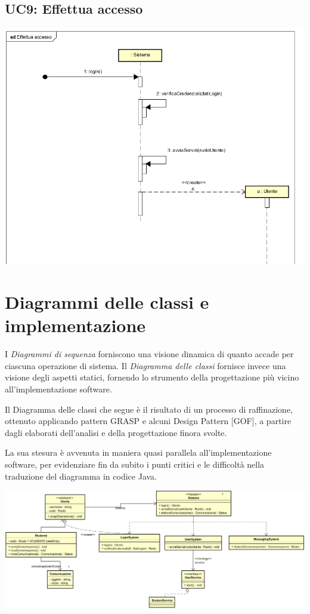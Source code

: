 \documentclass[12pt]{report}
\begin{document}
	\subsection{UC9: Effettua accesso}
	\begin{center}
		\includegraphics{./images/EffettuaAccesso.png}
	\end{center}
	
	\newpage
	
	\section{Diagrammi delle classi e implementazione}
	I \textit{Diagrammi di sequenza} forniscono una visione dinamica di quanto accade per ciascuna operazione di sistema. Il \textit{Diagramma delle classi} fornisce invece una visione degli aspetti statici, fornendo lo strumento della progettazione più vicino all'implementazione software.
	
	Il Diagramma delle classi che segue è il risultato di un processo di raffinazione, ottenuto applicando pattern GRASP e alcuni Design Pattern [GOF], a partire dagli elaborati dell'analisi e della progettazione finora svolte.
	
	La sua stesura è avvenuta in maniera quasi parallela all'implementazione software, per evidenziare fin da subito i punti critici e le difficoltà nella traduzione del diagramma in codice Java.	
	
	\begin{center}
		\includegraphics[scale= 0.6]{./images/DCD-I1.png}
	\end{center}
\end{document}
